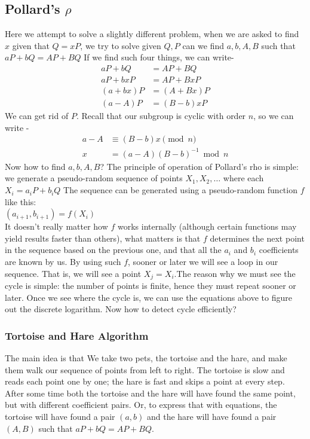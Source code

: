 \documentclass{article}
\begin{document}
\subsection{Pollard's $\rho$}
Here we attempt to solve a slightly different problem, when we are asked to find $x$ given that $Q=xP$, we try to solve given $Q,P$ can we find $a,b,A,B$ such that $aP+bQ=AP+BQ$
If we find such four things, we can write- 
\begin{align*}
  aP + bQ & = AP + BQ \\
  aP + bxP & = AP + BxP \\
  (a + bx) P & = (A + Bx) P \\
  (a - A) P & = (B - b) xP
\end{align*}
We can get rid of $P$. Recall that our subgroup is cyclic with order $n$, so we can write -
\begin{align*}
  a - A & \equiv (B - b) x \pmod{n} \\
  x & = (a - A)(B - b)^{-1} \bmod{n}
\end{align*}
Now how to find $a,b,A,B$? The principle of operation of Pollard's rho is simple: we generate a pseudo-random sequence of points $X_1,X_2,\dots$ where each $X_i=a_iP+b_iQ$ The sequence can be generated using a pseudo-random function $f$ like this:\\
$(a_{i + 1}, b_{i + 1}) = f(X_i)$\\
It doesn't really matter how $f$ works internally (although certain functions may yield results faster than others), what matters is that $f$ determines the next point in the sequence based on the previous one, and that all the $a_i$ and $b_i$ coefficients are known by us.
By using such $f$, sooner or later we will see a loop in our sequence. That is, we will see a point $X_j=X_i$.The reason why we must see the cycle is simple: the number of points is finite, hence they must repeat sooner or later. Once we see where the cycle is, we can use the equations above to figure out the discrete logarithm. Now how to detect cycle efficiently?
\subsubsection{Tortoise and Hare Algorithm}
The main idea is that We take two pets, the tortoise and the hare, and make them walk our sequence of points from left to right. The tortoise is slow and reads each point one by one; the hare is fast and skips a point at every step. After some time both the tortoise and the hare will have found the same point, but with different coefficient pairs. Or, to express that with equations, the tortoise will have found a pair $(a,b)$ and the hare will have found a pair $(A,B)$ such that $aP + bQ = AP + BQ$.
\end{document}
